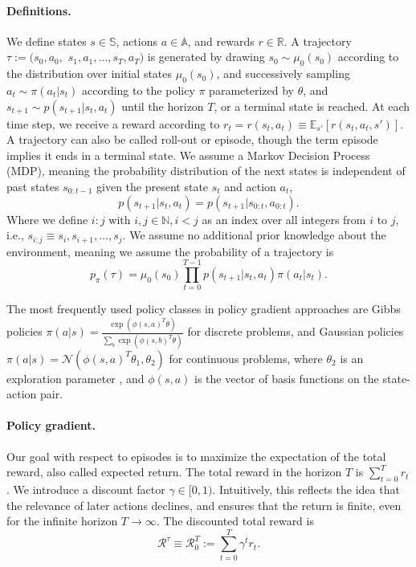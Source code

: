 \paragraph{Definitions.} 
We define states $s \in \mathbb{S}$, actions $a \in \mathbb{A}$, and rewards $r \in \mathbb{R}$. 
A trajectory $\tau := (s_0, a_0, $ $s_1, a_1, \dots, s_T, a_T)$ is generated by drawing $s_0 \sim \mu_0(s_0)$ according to the distribution over initial states $\mu_0(s_0)$, and successively sampling $a_t \sim \pi(a_t|s_t)$ according to the policy $\pi$ parameterized by $\theta$, and $s_{t+1} \sim p(s_{t+1}|s_t,a_t)$ until the horizon $T$, or a terminal state is reached. 
At each time step, we receive a reward according to $r_t = r(s_t, a_t) \equiv \mathbb{E}_{s'}\left[r(s_t,a_t,s')\right]$. 
A trajectory can also be called roll-out or episode, though the term episode implies it ends in a terminal state.
We assume a Markov Decision Process (MDP), meaning the probability distribution of the next states is independent of past states $s_{0:t-1}$ given the present state $s_t$ and action $a_t$, 
\begin{equation}
	p(s_{t+1}|s_t,a_t)=p(s_{t+1}|s_{0:t},a_{0:t}).
\end{equation}
Where we define $i:j$ with $i,j \in \mathbb{N}, i < j$ as an index over all integers from $i$ to $j$, i.e., $s_{i:j} \equiv s_i, s_{i+1}, \dots, s_j$. 
We assume no additional prior knowledge about the environment, meaning we assume the probability of a trajectory is 
\begin{equation}
	p_\pi(\tau) = \mu_0(s_0) \prod_{t=0}^{T-1} p(s_{t+1}|s_t, a_t) \pi(a_t|s_t).
\end{equation}

The most frequently used policy classes in policy gradient approaches are Gibbs policies $\pi(a|s) = \frac{\exp(\phi(s,a)^T\theta)}{\sum_b \exp(\phi(s,b)^T\theta)}$ \cite{Sutton:1999:PGM:3009657.3009806,Bagnell2004LearningD} for discrete problems, and Gaussian policies $\pi(a|s) = \mathcal{N}(\phi(s,a)^T\theta_1,\theta_2)$ for continuous problems, where $\theta_2$ is an exploration parameter \cite{Williams92simplestatistical,peter:article:1996}, and $\phi(s,a)$ is the vector of basis functions on the state-action pair.

\paragraph{Policy gradient.} 
Our goal with respect to episodes is to maximize the expectation of the total reward, also called expected return. 
The total reward in the horizon $T$ is $\sum_{t=0}^{T} r_{t}$. 
We introduce a discount factor $\gamma \in [0,1)$.
Intuitively, this reflects the idea that the relevance of later actions declines, and ensures that the return is finite, even for the infinite horizon $T \to \infty$. 
The discounted total reward is 
\begin{equation}
  \mathcal{R}^\tau \equiv \mathcal{R}_0^T := \sum_{t=0}^{T} \gamma^t r_t.
  \label{eqn:acc-reward}
\end{equation}

